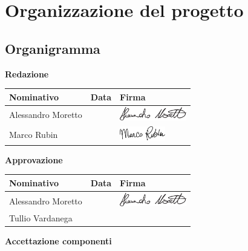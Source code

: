 	\section{Organizzazione del progetto}
	\subsection{Organigramma}
	
\textbf{Redazione}
\begin{center}
	\begin{tabu} to \textwidth {|X[4]|X[2c]|X[5]|}
	\hline
     Nominativo & Data & Firma \\ \hline
     Alessandro Moretto & & \includegraphics[height=6mm]{Commons/Pics/Signatures/Moretto.pdf}\\ \hline
     Marco Rubin & &\includegraphics[height=6mm]{Commons/Pics/Signatures/Rubin.pdf} \\ \hline
     \end{tabu}
	\end{center}
\textbf{Approvazione}
	\begin{center}
	\begin{tabu} to \textwidth {|X[4]|X[2c]|X[5]|}
	\hline
     Nominativo & Data & Firma \\ \hline
     Alessandro Moretto & & \includegraphics[height=6mm]{Commons/Pics/Signatures/Moretto.pdf}\\ \hline
     Tullio Vardanega & & \parbox[b]{1cm}{\vspace{6mm}}\\ \hline
     \end{tabu}
	\end{center}
\textbf{Accettazione componenti}
